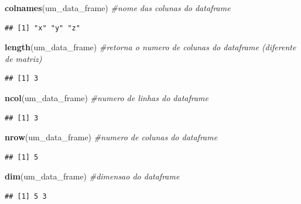 \documentclass[
]{book}
\newenvironment{Shaded}{\begin{snugshade}}{\end{snugshade}}
\newcommand{\CommentTok}[1]{\textcolor[rgb]{0.56,0.35,0.01}{\textit{#1}}}
\newcommand{\FunctionTok}[1]{\textcolor[rgb]{0.13,0.29,0.53}{\textbf{#1}}}
\newcommand{\NormalTok}[1]{#1}
\begin{document}
\begin{Shaded}
\begin{Highlighting}[]
\FunctionTok{colnames}\NormalTok{(um\_data\_frame) }\CommentTok{\#nome das colunas do dataframe}
\end{Highlighting}
\end{Shaded}

\begin{verbatim}
## [1] "x" "y" "z"
\end{verbatim}

\begin{Shaded}
\begin{Highlighting}[]
\FunctionTok{length}\NormalTok{(um\_data\_frame) }\CommentTok{\#retorna o numero de colunas do dataframe (diferente de matriz)}
\end{Highlighting}
\end{Shaded}

\begin{verbatim}
## [1] 3
\end{verbatim}

\begin{Shaded}
\begin{Highlighting}[]
\FunctionTok{ncol}\NormalTok{(um\_data\_frame) }\CommentTok{\#numero de linhas do dataframe}
\end{Highlighting}
\end{Shaded}

\begin{verbatim}
## [1] 3
\end{verbatim}

\begin{Shaded}
\begin{Highlighting}[]
\FunctionTok{nrow}\NormalTok{(um\_data\_frame) }\CommentTok{\#numero de colunas do dataframe}
\end{Highlighting}
\end{Shaded}

\begin{verbatim}
## [1] 5
\end{verbatim}

\begin{Shaded}
\begin{Highlighting}[]
\FunctionTok{dim}\NormalTok{(um\_data\_frame) }\CommentTok{\#dimensao do dataframe}
\end{Highlighting}
\end{Shaded}

\begin{verbatim}
## [1] 5 3
\end{verbatim}
\end{document}
